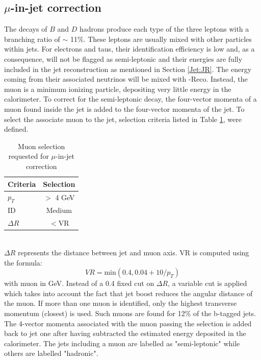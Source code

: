 \subsection{$\mu$-in-jet correction}
\label{Jet:Cal:BCal:MuInJet}
The decays of $B$ and $D$ hadrons produce each type of the three leptons with a branching ratio of $\sim$ 11\%. These leptons are usually mixed with other particles within jets. For electrons and taus, their identification efficiency is low and, as a consequence, will not be flagged as semi-leptonic and their energies are fully included in the jet reconstruction as mentioned in Section \ref{Jet:JR}. The energy coming from their associated neutrinos will be mixed with \pT-Reco. Instead, the muon is a minimum ionizing particle, depositing very little energy in the calorimeter. To correct for the semi-leptonic decay, the four-vector momenta of a muon found inside the jet is added to the four-vector momenta of the jet. To select the associate muon to the jet, selection criteria listed in Table \ref{tab:Jet:Cal:BCal:MuInJet:Sel}, were defined.
\begin{table}[htbp]
    \centering
    \begin{tabular}{lc}
       \hline\hline
        Criteria & Selection \\
        \hline
        $p_T$ & $>$ 4 GeV \\
         ID & Medium \\
         $\Delta R$ &  $<$VR\\
         \hline
         \hline
    \end{tabular}
    \caption{Muon selection requested for $\mu$-in-jet correction}
    \label{tab:Jet:Cal:BCal:MuInJet:Sel}
\end{table}
\\
$\Delta R$ represents the distance between jet and muon axis. VR is computed using the formula:
\begin{equation}
    VR = \text{min}(0.4, 0.04+10/p_T)
\end{equation}
with muon \pT in GeV. Instead of a 0.4 fixed cut on $\Delta R$, a variable cut is applied which takes into account the fact that jet boost reduces the angular distance of the muon. If more than one muon is identified, only the highest transverse momentum (closest) is used. Such muons are found for 12\% of the b-tagged jets. The 4-vector momenta associated with the muon passing the selection is added back to jet one after having subtracted the estimated energy deposited in the calorimeter. The jets including a muon are labelled as "semi-leptonic" while others are labelled "hadronic".

